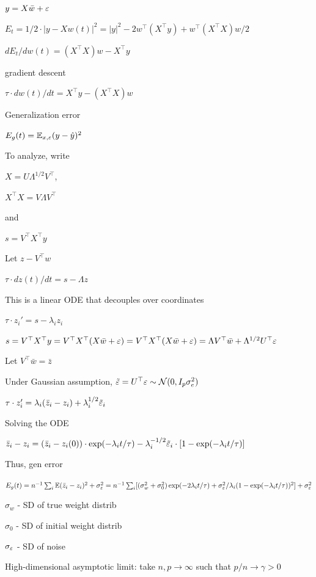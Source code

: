 \documentclass[english]{article}
\begin{document}
\item  $y = X\bar w+\varepsilon$

$E_t = 1/2\cdot |y-Xw(t)|^2 = |y|^2 - 2 w^\top (X^\top y) + w^\top  (X^\top X) w/2$

$dE_t/dw(t) =   (X^\top X) w - X^\top y $

gradient descent 

$\tau \cdot dw(t)/dt  =   X^\top y - (X^\top X) w$

Generalization error 

$E_g(t) = \mathbb{E}_{x,\varepsilon} (y-\hat y)^2$

\item To analyze, write

$X = U\Lambda^{1/2} V^\top$, 

$X^\top X  = V\Lambda V^\top$

and 

$s = V^\top X^\top y$

Let $z - V^\top w$

$\tau \cdot dz(t)/dt  =  s- \Lambda z$

This is a linear ODE that decouples over coordinates

$\tau \cdot z_i'  =  s- \lambda_i z_i$

$s = V^\top X^\top y =  V^\top X^\top (X\bar w+\varepsilon) =  V^\top X^\top (X\bar  w+\varepsilon) =  \Lambda V^\top\bar  w+ \Lambda^{1/2} U^\top \varepsilon$

Let $V^\top \bar w = \bar z$

Under Gaussian assumption, $\tilde {\varepsilon} = U^\top \varepsilon \sim \mathcal{N}(0,I_p\sigma_e^2)$

$\tau \cdot z_i'  =   \lambda_i (\bar z_i-z_i)+ \lambda_i^{1/2}\tilde {\varepsilon}_i$

Solving the ODE

$\bar z_i-z_i = (\bar z_i-z_i(0))\cdot \exp(-\lambda_i t/\tau) - \lambda_i^{-1/2}\tilde {\varepsilon}_i\cdot[1- \exp(-\lambda_i t/\tau)]$

Thus, gen error

$E_g(t) = n^{-1}  \sum_i  \mathbb{E} (\bar z_i-z_i)^2+\sigma_\varepsilon^2 =  
n^{-1}  \sum_i  [(\sigma_w^2+\sigma_0^2)\exp(-2\lambda_i t/\tau)+\sigma_\varepsilon^2/\lambda_i(1- \exp(-\lambda_i t/\tau))^2]+\sigma_\varepsilon^2$

$\sigma_w$ - SD of true weight distrib

$\sigma_0$ - SD of initial weight distrib

$\sigma_\varepsilon$ - SD of noise

\item 
High-dimensional asymptotic limit: take $n,p \to \infty$ such that $p/n\to \gamma>0$
\end{document}
